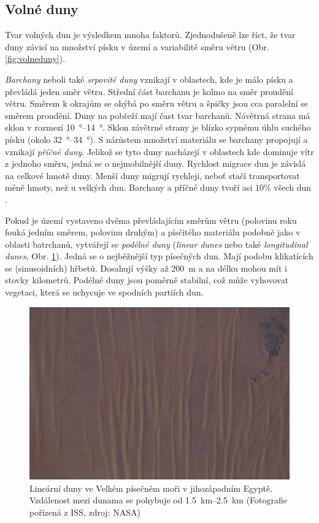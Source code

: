 \subsection{Volné duny}
Tvar volných dun je výsledkem mnoha faktorů. Zjednodušeně lze říct, že tvar duny závisí na množství písku v území a variabilitě směru větru (Obr. \ref{fig:volneduny}). 

\emph{Barchany} neboli také \emph{srpovité duny} vznikají v oblastech, kde je málo písku a převládá jeden směr větru. Střední část barchanu je kolmo na směr proudění větru. Směrem k okrajům se ohýbá po směru větru a špičky jsou cca paralelní se směrem proudění. Duny na pobřeží mají čast tvar barchanů. Návětrná strana má sklon v rozmezí \SIrange{10}{14}{\degree}. Sklon závětrné strany je blízko sypnému úhlu suchého písku (okolo \SIrange{32}{34}{\degree}). S nárůstem množství materiálu se barchany propojují a vznikají \emph{příčné duny}. Jelikož se tyto duny nacházejí v oblastech kde dominuje vítr z jednoho směru, jedná se o nejmobilnější duny. Rychlost migrace dun je závislá na celkové hmotě duny. Menší duny migrují rychleji, neboť stačí transportovat méně hmoty, než u velkých dun. Barchany a příčné duny tvoří asi $10 \%$ všech dun \parencite{breedMorphologyDistributionDunes1979}.

Pokud je území vystaveno dvěma převládajícím směrům větru (polovinu roku fouká jedním směrem, polovinu  druhým) a písčitého materiálu podobně jako v oblasti batrchanů, vytvářejí se \emph{podélné duny} (\textit{linear dunes} nebo také \textit{longitudinal dunes}, Obr. \ref{fig:linearniduny}). Jedná se o nejběžnější typ písečných dun. Mají podobu klikatících se (sinusoidních) hřbetů. Dosahují výšky až \SI{200}{\metre} a na délku mohou mít i stovky kilometrů. Podélné duny jsou poměrně stabilní, což může vyhovovat vegetaci, která se uchycuje ve spodních partiích dun.

\begin{figure}
	\centering
	\includegraphics[width=1\linewidth]{obrazky/eolicka/linearniduny}
	\caption{Lineární duny ve Velkém písečném moři v jihozápadním Egyptě. Vzdálenost mezi dunama se pohybuje od \SIrange{1,5}{2,5}{\kilo\metre} (Fotografie pořízená z ISS, zdroj: NASA)}
	\label{fig:linearniduny}
\end{figure}


